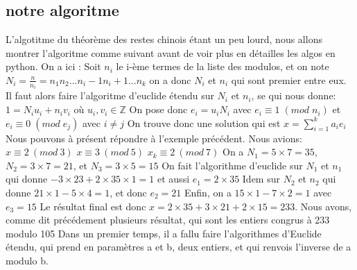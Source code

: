 \documentclass[a4paper, 11pt]{article}
\begin{document}
\subsection{notre algoritme}
L'algotitme du théorème des restes chinois étant un peu lourd, 
nous allons montrer l'algoritme comme suivant avant de voir plus en détailles les algos en python.
On a ici :
\newline
Soit $n_i$ le i-ème termes de la liste des modulos, et on note \newline
$ N_i=\frac{n}{n_i}=n_1 n_2 ... n_i-1 n_i+1 ... n_k $   \newline
on a donc $N_i$ et $n_i$  qui sont premier entre eux. \newline
Il faut alors faire l'algoritme d'euclide étendu sur $N_i$ et $n_i$, se qui nous donne: 
$1= N_i u_i + n_i v_i$ 
où 
$u_i, v_i \in  \mathbb{Z} $
\newline
On pose donc $e_i = u_i N_i$ avec $ e_i \equiv 1 \; (mod \; n_i)$ et $ e_i\equiv 0 \; (mod \; e_j)$ avec $ i\neq j$ \newline
On trouve donc une solution qui est $x=\sum_{i = 1}^{k}{a_i e_i}  $
\newline
Nous pouvons à présent répondre à l'exemple précédent. Nous avions: \newline
$ x\equiv 2 \: (mod \:  3)$ 
\newline
$ x\equiv 3 \: (mod \: 5)$
\newline
$ x_k \equiv 2 \:(mod\: 7)$
\newline
On a $N_1=5\times 7=35$, $N_2=3\times 7=21 $, et $N_3=3\times 5=15$ \newline
On fait l'algorithme d'euclide sur $N_1$ et $n_1$ qui donne $-3\times 23 +2\times 35\times 1= 1 $ et aussi $e_1=2\times 35$ \newline
Idem sur $N_2$ et $n_2$ qui donne $21\times 1 - 5\times 4=1$, et donc $e_2=21$ \newline
Enfin, on a $15\times 1- 7\times 2 = 1 $ avec $e_3=15$ \newline
Le résultat final est donc $x=2\times 35 + 3\times 21 + 2\times 15 =233$. Nous avons, comme dit précédement plusieurs résultat, qui sont les entiers congrus à 233 modulo 105
\newline
Dans un premier temps, il a fallu faire l'algorithmes d'Euclide étendu, qui prend en paramètres a et b, deux entiers,
et qui renvois l'inverse de a modulo b.
\newline



\newpage
\end{document}
